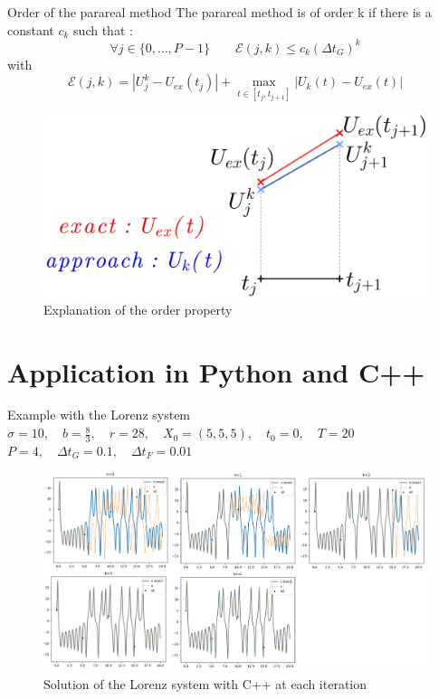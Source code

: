\begin{frame}{Order of the parareal method}
	The parareal method is of order k if there is a constant $c_k$ such that :
	\begin{equation*}
		\forall j\in\{0,\dots,P-1\} \qquad \mathcal{E}(j,k)\le c_k(\Delta t_G)^k
	\end{equation*}
	with
	$$\mathcal{E}(j,k)=|U_j^k-U_{ex}(t_j)|+\max_{t\in[t_j,t_{j+1}]}|U_k(t)-U_{ex}(t)|$$
	\begin{figure}
		\centering
		\includegraphics[width=0.62\linewidth]{images/parareal/explane_order.jpg}
		\caption{Explanation of the order property}
	\end{figure}
\end{frame}

\section{Application in Python and C++}

\begin{frame}{Example with the Lorenz system}
	\centering
	$\sigma=10, \quad b=\frac{8}{3}, \quad r=28, \quad X_0=(5,5,5), \quad t_0=0, \quad T=20$
	$P=4,\quad \Delta t_G=0.1, \quad \Delta t_F=0.01$
	\begin{figure}
		\centering
		\includegraphics[width=0.8\linewidth]{"images/parareal/lorenz_4p.jpg"}
		\caption{Solution of the Lorenz system with C++ at each iteration}
	\end{figure}
\end{frame}

